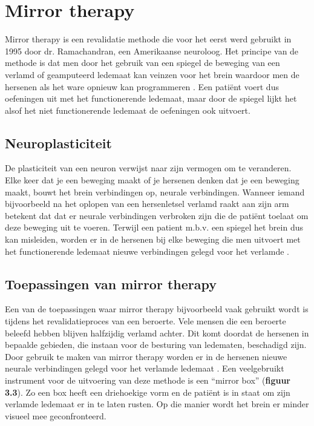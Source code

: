 \section{Mirror therapy}
Mirror therapy is een revalidatie methode die voor het eerst werd gebruikt in 1995 door dr. Ramachandran, een Amerikaanse neuroloog. Het principe van de methode is dat men door het gebruik van een spiegel de beweging van een verlamd of geamputeerd ledemaat kan veinzen voor het brein waardoor men de hersenen als het ware opnieuw kan programmeren \autocite{Physiopedia2019}.
Een patiënt voert dus oefeningen uit met het functionerende ledemaat, maar door de spiegel lijkt het alsof het niet functionerende ledemaat de oefeningen ook uitvoert.

\subsection{Neuroplasticiteit}
De plasticiteit van een neuron verwijst naar zijn vermogen om te veranderen. Elke keer dat je een beweging maakt of je hersenen denken dat je een beweging maakt, bouwt het brein verbindingen op, neurale verbindingen. Wanneer iemand bijvoorbeeld na het oplopen van een hersenletsel verlamd raakt aan zijn arm betekent dat dat er neurale verbindingen verbroken zijn die de patiënt toelaat om deze beweging uit te voeren. Terwijl een patient m.b.v. een spiegel het brein dus kan misleiden, worden er in de hersenen bij elke beweging die men uitvoert met het functionerende ledemaat nieuwe verbindingen gelegd voor het verlamde  \autocite{Saebo2018}.

\subsection{Toepassingen van mirror therapy}
Een van de toepassingen waar mirror therapy bijvoorbeeld vaak gebruikt wordt is tijdens het revalidatieproces van een beroerte.  Vele mensen die een beroerte beleefd hebben blijven halfzijdig verlamd achter. Dit komt doordat de hersenen in bepaalde gebieden, die instaan voor de besturing van  ledematen, beschadigd zijn. Door gebruik te maken van mirror therapy worden er in de hersenen nieuwe neurale verbindingen gelegd voor het verlamde ledemaat \autocite{Rehab2018}. Een veelgebruikt instrument voor de uitvoering van deze methode is een “mirror box” (\textbf{figuur 3.3}). Zo een box heeft een driehoekige vorm en de patiënt is in staat om zijn verlamde ledemaat er in te laten rusten. Op die manier wordt het brein er minder visueel mee geconfronteerd.


